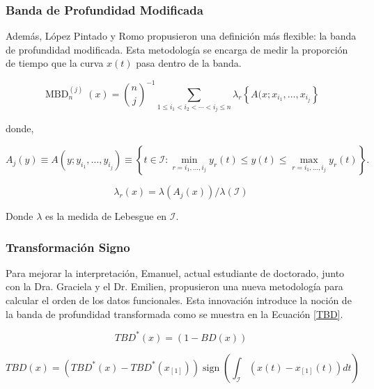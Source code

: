 \subsubsection{Banda de Profundidad Modificada}

Además, López Pintado y Romo propusieron una definición más flexible: la banda de profundidad modificada. Esta metodología se encarga de medir la proporción de tiempo que la curva $x(t)$ pasa dentro de la banda. \cite{boxplotFun}

\begin{equation}
    \operatorname{MBD}_n^{(j)}(x) = \binom{n}{j}^{-1} \sum_{1 \leq i_1<i_2<\cdots<i_j \leq n} \lambda_r \left\{ A(x ; x_{i_{1}}, \dots, x_{i_{j}}\right\}
\end{equation}

donde, 

\begin{equation}
    A_j(y) \equiv A\left(y ; y_{i_1}, \ldots, y_{i_j}\right) \equiv \left\{t \in \mathcal{I}: \min _{r=i_1, \ldots, i_j} y_r(t) \leq y(t) \leq \max _{r=i_1, \ldots, i_j} y_r(t) \right\}.
\end{equation}

\begin{equation}
    \lambda_r(x) = \lambda(A_j(x))/\lambda(\mathcal{I})
\end{equation}

Donde $\lambda$ es la medida de Lebesgue en $\mathcal{I}$.
\subsubsection{Transformación Signo}

    Para mejorar la interpretación, Emanuel, actual estudiante de doctorado, junto con la Dra. Graciela y el Dr. Emilien, propusieron una nueva metodología para calcular el orden de los datos funcionales. Esta innovación introduce la noción de la banda de profundidad transformada como se muestra en la Ecuación \eqref{TBD}. \cite{BandaEmanuel}

\begin{equation}
    T B D^*(x)=(1-B D(x))
\end{equation}

\begin{equation}\label{TBD}
T B D(x)=\left(T B D^*(x)-T B D^*\left(x_{[1]}\right)\right) \operatorname{sign}\left(\int_{\mathcal{I}}\left(x(t)-x_{[1]}(t)\right) d t\right)
\end{equation}

